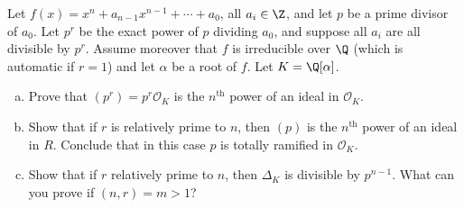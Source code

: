 \documentclass[11pt,letterpaper]{article}
\begin{document}
\begin{cproblem}{3.28}
    Let $f(x)=x^n+a_{n-1}x^{n-1}+\cdots+a_0$, all $a_i\in \Z$, and let $p$ be a prime divisor of $a_0$. Let $p^r$ be the exact power of $p$ dividing $a_0$, and suppose all $a_i$ are all divisible by $p^r$. Assume moreover that $f$ is irreducible over $\Q$ (which is automatic if $r=1$) and let $\alpha$ be a root of $f$. Let $K=\Q[\alpha]$.
    \begin{enumerate}[(a)]
        \item Prove that $(p^r)=p^r \mathcal{O}_K$ is the $n^{\text{th}}$ power of an ideal in $\mathcal{O}_K  $. %
        \item Show that if $r$ is relatively prime to $n$, then $(p)$ is the $n^{\text{th}}$ power of an ideal in $R$. Conclude that in this case $p$ is totally ramified in $\mathcal{O}_K$.
        \item Show that if $r$ relatively prime to $n$, then $\Delta_{K}$ is divisible by $p^{n-1}$. What can you prove if $(n,r)=m>1$? %
    \end{enumerate}
\end{cproblem}
\end{document}
